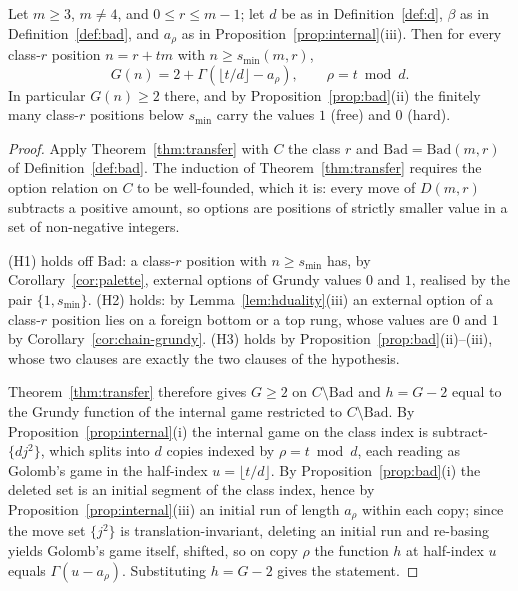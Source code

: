 \begin{theorem}\label{thm:grundy-transfer}
Let $m \ge 3$, $m \ne 4$, and $0 \le r \le m-1$; let $d$ be as in
Definition~\ref{def:d}, $\beta$ as in Definition~\ref{def:bad}, and
$a_\rho$ as in Proposition~\ref{prop:internal}(iii). Then for every
class-$r$ position $n = r + tm$ with $n \ge s_{\min}(m,r)$,
\[ G(n) = 2 + \Gamma\!\left( \lfloor t/d \rfloor - a_\rho \right),
\qquad \rho = t \bmod d. \]
In particular $G(n) \ge 2$ there, and by
Proposition~\ref{prop:bad}(ii) the finitely many class-$r$ positions
below $s_{\min}$ carry the values $1$ (free) and $0$ (hard).
\end{theorem}
\begin{proof}
Apply Theorem~\ref{thm:transfer} with $C$ the class $r$ and
$\mathrm{Bad} = \mathrm{Bad}(m,r)$ of Definition~\ref{def:bad}. The
induction of Theorem~\ref{thm:transfer} requires the option relation on
$C$ to be well-founded, which it is: every move of $D(m,r)$ subtracts a
positive amount, so options are positions of strictly smaller value in a
set of non-negative integers.

(H1) holds off $\mathrm{Bad}$: a class-$r$ position with
$n \ge s_{\min}$ has, by Corollary~\ref{cor:palette}, external options of
Grundy values $0$ and $1$, realised by the pair $\{1, s_{\min}\}$. (H2)
holds: by Lemma~\ref{lem:hduality}(iii) an external option of a class-$r$
position lies on a foreign bottom or a top rung, whose values are $0$ and
$1$ by Corollary~\ref{cor:chain-grundy}. (H3) holds by
Proposition~\ref{prop:bad}(ii)--(iii), whose two clauses are exactly the
two clauses of the hypothesis.

Theorem~\ref{thm:transfer} therefore gives $G \ge 2$ on
$C \setminus \mathrm{Bad}$ and $h = G - 2$ equal to the Grundy function
of the internal game restricted to $C \setminus \mathrm{Bad}$. By
Proposition~\ref{prop:internal}(i) the internal game on the class index
is subtract-$\{d j^2\}$, which splits into $d$ copies indexed by
$\rho = t \bmod d$, each reading as Golomb's game in the half-index
$u = \lfloor t/d \rfloor$. By Proposition~\ref{prop:bad}(i) the deleted
set is an initial segment of the class index, hence by
Proposition~\ref{prop:internal}(iii) an initial run of length $a_\rho$
within each copy; since the move set $\{j^2\}$ is translation-invariant,
deleting an initial run and re-basing yields Golomb's game itself,
shifted, so on copy $\rho$ the function $h$ at half-index $u$ equals
$\Gamma(u - a_\rho)$. Substituting $h = G - 2$ gives the statement.
\end{proof}

